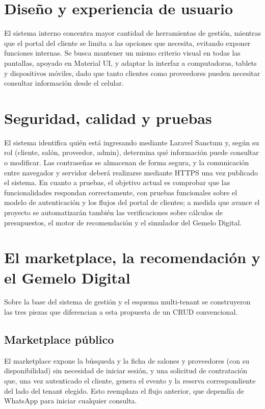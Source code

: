 \section{Diseño y experiencia de usuario}

El sistema interno concentra mayor cantidad de herramientas de gestión,
mientras que el portal del cliente se limita a las opciones que necesita,
evitando exponer funciones internas. Se busca mantener un mismo criterio
visual en todas las pantallas, apoyado en Material UI, y adaptar la
interfaz a computadoras, tablets y dispositivos móviles, dado que tanto
clientes como proveedores pueden necesitar consultar información desde
el celular.

\section{Seguridad, calidad y pruebas}

El sistema identifica quién está ingresando mediante Laravel Sanctum y,
según su rol (cliente, salón, proveedor, admin), determina qué
información puede consultar o modificar. Las contraseñas se almacenan de
forma segura, y la comunicación entre navegador y servidor deberá
realizarse mediante HTTPS una vez publicado el sistema. En cuanto a
pruebas, el objetivo actual es comprobar que las funcionalidades
respondan correctamente, con pruebas funcionales sobre el modelo de
autenticación y los flujos del portal de clientes; a medida que avance el
proyecto se automatizarán también las verificaciones sobre cálculos de
presupuestos, el motor de recomendación y el simulador del Gemelo
Digital.

\section{El marketplace, la recomendación y el Gemelo Digital}

Sobre la base del sistema de gestión y el esquema multi-tenant se
construyeron las tres piezas que diferencian a esta propuesta de un CRUD
convencional.

\subsection{Marketplace público}

El marketplace expone la búsqueda y la ficha de salones y proveedores
(con su disponibilidad) sin necesidad de iniciar sesión, y una solicitud
de contratación que, una vez autenticado el cliente, genera el evento y
la reserva correspondiente del lado del tenant elegido. Esto reemplaza el
flujo anterior, que dependía de WhatsApp para iniciar cualquier consulta.

